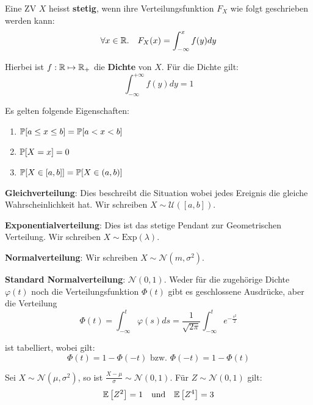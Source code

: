 \columnbreak



\begin{tcolorbox}
    Eine ZV $X$ heisst \textbf{stetig}, wenn ihre Verteilungsfunktion $F_X$ wie folgt geschrieben werden kann:
    $$\forall x \in \mathbb{R}. \quad F_X(x) = \int_{-\infty}^x f(y)dy$$
\end{tcolorbox}

Hierbei ist $f: \mathbb{R} \mapsto \mathbb{R}_+$ die \textbf{Dichte} von $X$. Für die Dichte gilt:
$$\int_{-\infty}^{+\infty} f(y)dy = 1$$

Es gelten folgende Eigenschaften: 
\begin{enumerate}
    \item $\mathbb{P} [a \leq x \leq b] = \mathbb{P} [a < x < b]$ 
    \item $\mathbb{P}[X = x] = 0$
    \item $\mathbb{P}[X \in [a, b ]] = \mathbb{P} [X \in (a,b)]$
\end{enumerate}



\textbf{Gleichverteilung}: Dies beschreibt die Situation wobei jedes Ereignis die gleiche Wahrscheinlichkeit hat. Wir schreiben $X \sim \mathcal{U}([a,b])$. \medskip

\textbf{Exponentialverteilung}: Dies ist das stetige Pendant zur Geometrischen Verteilung. Wir schreiben $X \sim \text{Exp}(\lambda)$. \medskip

\textbf{Normalverteilung}: Wir schreiben $X \sim \mathcal{N}(m, \sigma^2)$. \medskip

\textbf{Standard Normalverteilung}: $\mathcal{N}(0,1)$. Weder für die zugehörige Dichte $\varphi(t)$ noch die Verteilungsfunktion $\Phi(t)$ gibt es geschlossene Ausdrücke, aber die Verteilung
$$\Phi(t) = \int_{-\infty}^t \varphi(s)ds = \frac{1}{\sqrt{2 \pi}} \int_{-\infty}^t e^{-\frac{s^2}{2}}$$

ist tabelliert, wobei gilt:
$$\Phi(t) = 1 - \Phi(-t) \text{ bzw. } \Phi(-t) = 1 - \Phi(t)$$

Sei $X \sim \mathcal{N}(\mu,\sigma^2)$, so ist $\frac{X - \mu}{\sigma} \sim \mathcal{N}(0,1)$. Für $Z \sim \mathcal{N}(0, 1)$ gilt:
$$\mathbb{E}\left[Z^2\right] = 1 \quad \text{und} \quad \mathbb{E} \left[Z^4\right] = 3$$
